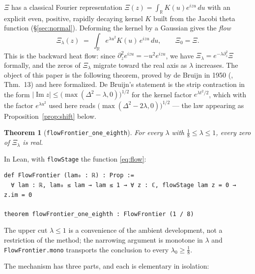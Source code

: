\documentclass[11pt]{article}
\newtheorem{theorem}{Theorem}
\theoremstyle{definition}
\DeclareMathOperator{\Imop}{Im}
\begin{document}
$\Xi$ has a classical Fourier representation $\Xi(z)=\int_{\mathbb R}K(u)e^{izu}\,du$ \cite[\S10.1]{Titchmarsh} with an explicit even,
positive, rapidly decaying kernel $K$ built from the Jacobi theta function (\S\ref{sec:normal}).
Deforming the kernel by a Gaussian gives the \emph{flow}
\begin{equation}\label{eq:flow}
  \Xi_\lambda(z)\;=\;\int_{\mathbb R} e^{\lambda u^{2}}K(u)\,e^{izu}\,du ,
  \qquad \Xi_0=\Xi .
\end{equation}
This is the backward heat flow: since $\partial_z^{2}e^{izu}=-u^{2}e^{izu}$, we have
$\Xi_\lambda=e^{-\lambda\partial_z^{2}}\Xi$ formally, and the zeros of $\Xi_\lambda$ migrate toward the
real axis as $\lambda$ increases.  The object of this paper is the following theorem, proved by
de Bruijn in 1950 (\cite{deBruijn1950}, Thm.~13) and here formalized.  De Bruijn's statement is the
strip contraction in the form $|\Imop z|\le\bigl(\max(\Delta^{2}-\lambda,0)\bigr)^{1/2}$ for the kernel
factor $e^{\lambda t^{2}/2}$, which with the factor $e^{\lambda u^{2}}$ used here reads
$\bigl(\max(\Delta^{2}-2\lambda,0)\bigr)^{1/2}$ --- the law appearing as
Proposition~\ref{prop:shift} below.

\begin{theorem}[\texttt{flowFrontier\_one\_eighth}]\label{thm:main}
For every $\lambda$ with $\tfrac18\le\lambda\le 1$, every zero of $\Xi_\lambda$ is real.
\end{theorem}

In Lean, with \texttt{flowStage} the function \eqref{eq:flow}:

\begin{lstlisting}
def FlowFrontier (lam₀ : ℝ) : Prop :=
  ∀ lam : ℝ, lam₀ ≤ lam → lam ≤ 1 → ∀ z : ℂ, flowStage lam z = 0 → z.im = 0

theorem flowFrontier_one_eighth : FlowFrontier (1 / 8)
\end{lstlisting}

\noindent The upper cut $\lambda\le1$ is a convenience of the ambient development, not a restriction of
the method; the narrowing argument is monotone in $\lambda$ and \texttt{FlowFrontier.mono} transports
the conclusion to every $\lambda_0\ge\tfrac18$.

The mechanism has three parts, and each is elementary in isolation:
\end{document}
